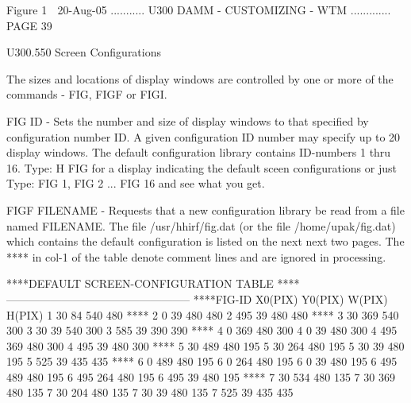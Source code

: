                                     Figure 1
    
   20-Aug-05 ........... U300  DAMM - CUSTOMIZING - WTM ............. PAGE  39
 
   U300.550  Screen Configurations
 
   The sizes and locations of display windows are controlled by  one  or  more
   of the commands - FIG, FIGF or FIGI.
 
   FIG ID - Sets the number and size of display windows to that specified
          by configuration number ID. A given configuration ID number
          may specify up to 20 display windows. The default configuration
          library contains ID-numbers 1 thru 16. Type: H FIG for a
          display indicating the default sceen configurations or just
          Type: FIG 1, FIG 2 ... FIG 16 and see what you get.
 
   FIGF FILENAME - Requests that a new configuration library be read from
          a file named FILENAME. The file /usr/hhirf/fig.dat (or the file
          /home/upak/fig.dat) which contains the default configuration is
          listed on the next next two pages. The **** in col-1 of the table
          denote comment lines and are ignored in processing.
 
   ****DEFAULT SCREEN-CONFIGURATION TABLE
   ****--------------------------------------------------
   ****FIG-ID   X0(PIX)   Y0(PIX)    W(PIX)    H(PIX)
            1        30        84       540       480
   ****
            2         0        39       480       480
            2       495        39       480       480
   ****
            3        30       369       540       300
            3        30        39       540       300
            3       585        39       390       390
   ****
            4         0       369       480       300
            4         0        39       480       300
            4       495       369       480       300
            4       495        39       480       300
   ****
            5        30       489       480       195
            5        30       264       480       195
            5        30        39       480       195
            5       525        39       435       435
   ****
            6         0       489       480       195
            6         0       264       480       195
            6         0        39       480       195
            6       495       489       480       195
            6       495       264       480       195
            6       495        39       480       195
   ****
            7        30       534       480       135
            7        30       369       480       135
            7        30       204       480       135
            7        30        39       480       135
            7       525        39       435       435
 
